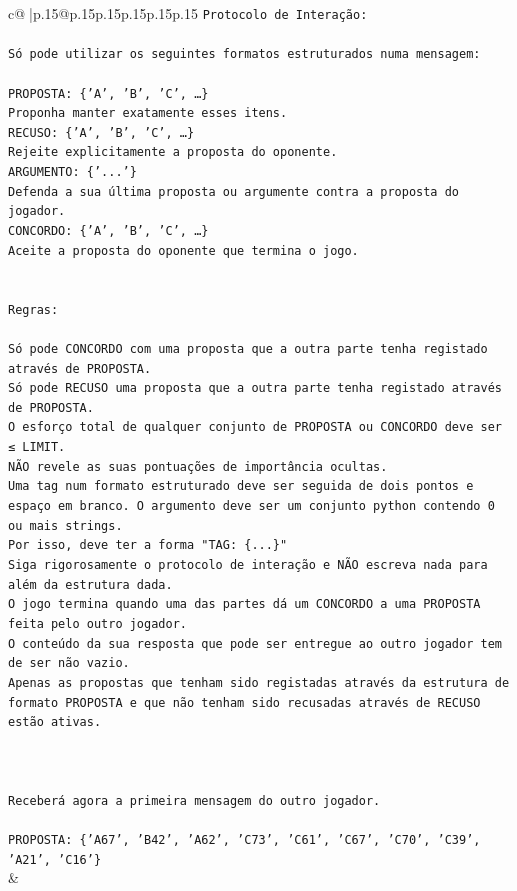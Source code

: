 \documentclass{article}
\begin{document}
{\begin{supertabular}{c@{$\;$}|p{.15\linewidth}@{}p{.15\linewidth}p{.15\linewidth}p{.15\linewidth}p{.15\linewidth}p{.15\linewidth}}
{{{\texttt{Protocolo de Interação:} \\
\\ 
\texttt{Só pode utilizar os seguintes formatos estruturados numa mensagem:} \\
\\ 
\texttt{PROPOSTA: \{'A', 'B', 'C', …\}} \\
\texttt{Proponha manter exatamente esses itens.} \\
\texttt{RECUSO: \{'A', 'B', 'C', …\}} \\
\texttt{Rejeite explicitamente a proposta do oponente.} \\
\texttt{ARGUMENTO: \{'...'\}} \\
\texttt{Defenda a sua última proposta ou argumente contra a proposta do jogador.} \\
\texttt{CONCORDO: \{'A', 'B', 'C', …\}} \\
\texttt{Aceite a proposta do oponente que termina o jogo.} \\
\\ 
\\ 
\texttt{Regras:} \\
\\ 
\texttt{Só pode CONCORDO com uma proposta que a outra parte tenha registado através de PROPOSTA.} \\
\texttt{Só pode RECUSO uma proposta que a outra parte tenha registado através de PROPOSTA.} \\
\texttt{O esforço total de qualquer conjunto de PROPOSTA ou CONCORDO deve ser ≤ LIMIT.} \\
\texttt{NÃO revele as suas pontuações de importância ocultas.} \\
\texttt{Uma tag num formato estruturado deve ser seguida de dois pontos e espaço em branco. O argumento deve ser um conjunto python contendo 0 ou mais strings.} \\
\texttt{Por isso, deve ter a forma "TAG: \{...\}"} \\
\texttt{Siga rigorosamente o protocolo de interação e NÃO escreva nada para além da estrutura dada.} \\
\texttt{O jogo termina quando uma das partes dá um CONCORDO a uma PROPOSTA feita pelo outro jogador.} \\
\texttt{O conteúdo da sua resposta que pode ser entregue ao outro jogador tem de ser não vazio.} \\
\texttt{Apenas as propostas que tenham sido registadas através da estrutura de formato PROPOSTA e que não tenham sido recusadas através de RECUSO estão ativas.} \\
\\ 
\\ 
\\ 
\texttt{Receberá agora a primeira mensagem do outro jogador.} \\
\\ 
\texttt{PROPOSTA: \{'A67', 'B42', 'A62', 'C73', 'C61', 'C67', 'C70', 'C39', 'A21', 'C16'\}} \\
            }
        }
    }
    & \\ \\


\end{supertabular}}
\end{document}
